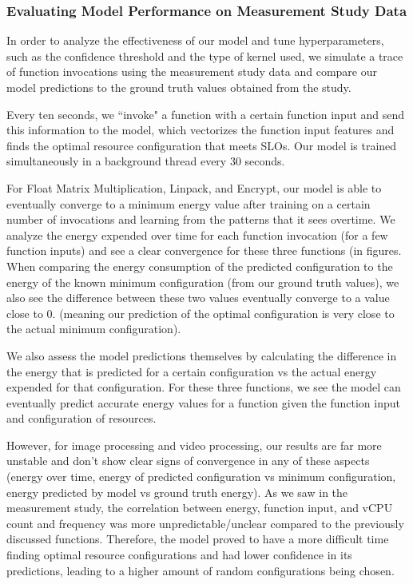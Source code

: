 \documentclass[times, 10pt,twocolumn]{article}
\begin{document}
 \subsubsection{Evaluating Model Performance on Measurement Study Data}
In order to analyze the effectiveness of our model and tune hyperparameters, such as the confidence threshold and the type of kernel used, we simulate a trace of function invocations using the measurement study data and compare our model predictions to the ground truth values obtained from the study.

Every ten seconds, we ``invoke" a function with a certain function input and send this information to the model, which vectorizes the function input features and finds the optimal resource configuration that meets SLOs. Our model is trained simultaneously in a background thread every 30 seconds. 
 
For Float Matrix Multiplication, Linpack, and Encrypt, our model is able to eventually converge to a minimum energy value after training on a certain number of invocations and learning from the patterns that it sees overtime. We analyze the energy expended over time for each function invocation (for a few function inputs) and see a clear convergence for these three functions (in figures. When comparing the energy consumption of the predicted configuration to the energy of the known minimum configuration (from our ground truth values), we also see the difference between these two values eventually converge to a value close to 0. (meaning our prediction of the optimal configuration is very close to the actual minimum configuration). 

We also assess the model predictions themselves by calculating the difference in the energy that is predicted for a certain configuration vs the actual energy expended for that configuration. For these three functions, we see the model can eventually predict accurate energy values for a function given the function input and configuration of resources.

However, for image processing and video processing, our results are far more unstable and don't show clear signs of convergence in any of these aspects (energy over time, energy of predicted configuration vs minimum configuration, energy predicted by model vs ground truth energy). As we saw in the measurement study, the correlation between energy, function input, and vCPU count and frequency was more unpredictable/unclear compared to the previously discussed functions. Therefore, the model proved to have a more difficult time finding optimal resource configurations and had lower confidence in its predictions, leading to a higher amount of random configurations being chosen. 
\end{document}
